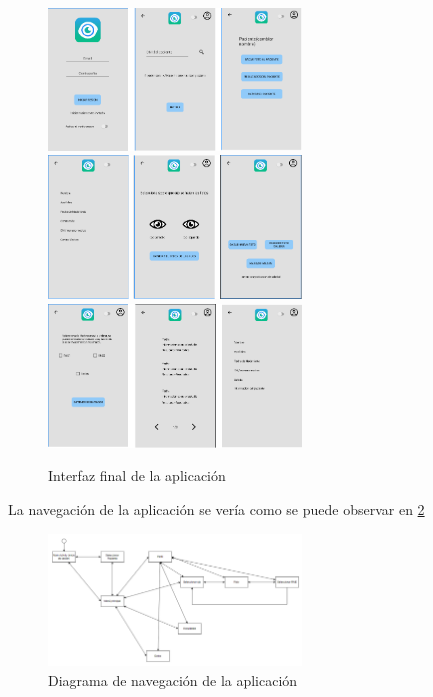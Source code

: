         \begin{figure}[!ht]
                 \centering
                 \includegraphics[width=0.6\textwidth]{img/interfaz1-final.png}
                 \centering
                 \includegraphics[width=0.6\textwidth]{img/Interfaz2-final.png}
                 \centering
                 \includegraphics[width=0.6\textwidth]{img/Interfaz3-final.png}
                  \caption{Interfaz final de la aplicación}
                 \label{fig:interfazFinal}
        \end{figure}

La navegación de la aplicación se vería como se puede observar en \ref{fig:diagrama de navegación}
        \begin{figure}[!ht]
                 \centering
                 \includegraphics[width=0.6\textwidth]{img/Diagrama de navegacion.png}
                  \caption{Diagrama de navegación de la aplicación}
                 \label{fig:diagrama de navegación}
        \end{figure}